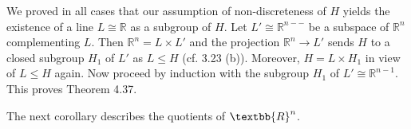 \documentclass[12pt]{article}
\begin{document}
    We proved in all cases that our assumption of non-discreteness of $H$ yields the existence of a line $L \cong \mathbb{R}$ as
a subgroup of $H$. Let $L' \cong \mathbb{R}^{n−-}$ be a subspace of $\mathbb{R}^n$ complementing $L$. Then $\mathbb{R}^n = L \times L'$ and the projection
$\mathbb{R}^n \to L'$ sends $H$ to a closed subgroup $H_1$ of $L'$ as $L \leq H$ (cf. 3.23 (b)). Moreover, $H = L \times H_1$ in view of
$L \leq H$ again. Now proceed by induction with the subgroup $H_1$ of $L' \cong \mathbb{R}^{n-1}$. This proves Theorem 4.37.


    The next corollary describes the quotients of $\textbb{R}^n$.
\end{document}
